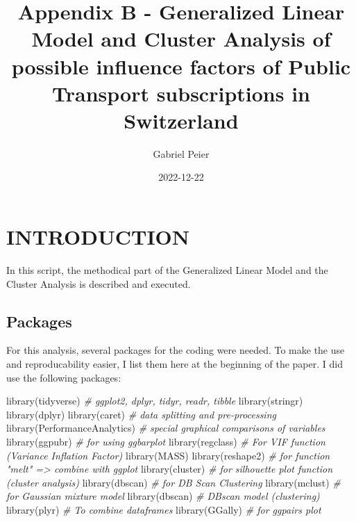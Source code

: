 \documentclass[
]{article}
\title{Appendix B - Generalized Linear Model and Cluster Analysis of
possible influence factors of Public Transport subscriptions in
Switzerland}
\author{Gabriel Peier}
\date{2022-12-22}
\newenvironment{Shaded}{\begin{snugshade}}{\end{snugshade}}
\newcommand{\CommentTok}[1]{\textcolor[rgb]{0.56,0.35,0.01}{\textit{#1}}}
\newcommand{\FunctionTok}[1]{\textcolor[rgb]{0.00,0.00,0.00}{#1}}
\newcommand{\NormalTok}[1]{#1}
\begin{document}
\maketitle

\graphicspath{ {G:/My Drive/MasterThesis/Scripts/Outputs}}

\hypertarget{introduction}{%
\section{INTRODUCTION}\label{introduction}}

In this script, the methodical part of the Generalized Linear Model and
the Cluster Analysis is described and executed.

\hypertarget{packages}{%
\subsection{Packages}\label{packages}}

For this analysis, several packages for the coding were needed. To make
the use and reproducability easier, I list them here at the beginning of
the paper. I did use the following packages:

\begin{Shaded}
\begin{Highlighting}[]
\FunctionTok{library}\NormalTok{(tidyverse)             }\CommentTok{\# ggplot2, dplyr, tidyr, readr, tibble}
\FunctionTok{library}\NormalTok{(stringr)}
\FunctionTok{library}\NormalTok{(dplyr)}
\FunctionTok{library}\NormalTok{(caret)                 }\CommentTok{\# data splitting and pre{-}processing}
\FunctionTok{library}\NormalTok{(PerformanceAnalytics)  }\CommentTok{\# special graphical comparisons of variables}
\FunctionTok{library}\NormalTok{(ggpubr)                }\CommentTok{\# for using ggbarplot}
\FunctionTok{library}\NormalTok{(regclass)              }\CommentTok{\# For VIF function (Variance Inflation Factor)}
\FunctionTok{library}\NormalTok{(MASS)}
\FunctionTok{library}\NormalTok{(reshape2)              }\CommentTok{\# for function "melt" =\textgreater{} combine with ggplot}
\FunctionTok{library}\NormalTok{(cluster)               }\CommentTok{\# for silhouette plot function (cluster analysis)}
\FunctionTok{library}\NormalTok{(dbscan)                }\CommentTok{\# for DB Scan Clustering}
\FunctionTok{library}\NormalTok{(mclust)                }\CommentTok{\# for Gaussian mixture model}
\FunctionTok{library}\NormalTok{(dbscan)                }\CommentTok{\# DBscan model (clustering)}
\FunctionTok{library}\NormalTok{(plyr)                  }\CommentTok{\# To combine dataframes}
\FunctionTok{library}\NormalTok{(GGally)                }\CommentTok{\# for ggpairs plot}
\end{Highlighting}
\end{Shaded}
\end{document}
